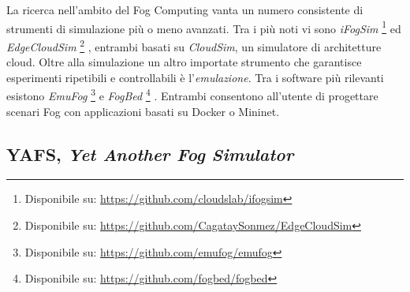 La ricerca nell'ambito del Fog Computing vanta un numero consistente di strumenti di simulazione più o meno avanzati. Tra i più noti vi sono \textit{iFogSim} \footnote{Disponibile su: \url{https://github.com/cloudslab/ifogsim}} \cite{iFogSim} ed \textit{EdgeCloudSim} \footnote{Disponibile su: \url{https://github.com/CagataySonmez/EdgeCloudSim}} \cite{EdgeCloudSim}, entrambi basati su \textit{CloudSim}, un simulatore di architetture cloud. Oltre alla simulazione un altro importate strumento che garantisce esperimenti ripetibili e controllabili è l'\textit{emulazione}. Tra i software più rilevanti esistono \textit{EmuFog} \footnote{Disponibile su: \url{https://github.com/emufog/emufog}} \cite{EmuFog} e \textit{FogBed} \footnote{Disponibile su: \url{https://github.com/fogbed/fogbed}} \cite{FogBed}. Entrambi consentono all'utente di progettare scenari Fog con applicazioni basati su Docker o Mininet.

\subsection{YAFS, \textit{Yet Another Fog Simulator}}

